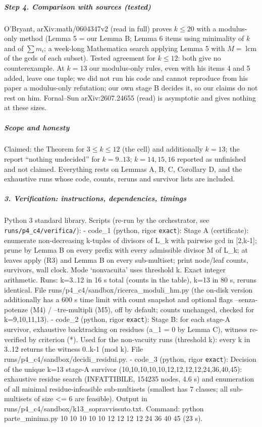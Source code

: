 \documentclass[11pt,a4paper]{article}
\begin{document}
\subparagraph{Step 4. Comparison with sources
(tested)}\label{step-4.-comparison-with-sources-tested}

O'Bryant, arXiv:math/0604347v2 (read in full) proves \(k\le20\) with a
modulus-only method (Lemma 5 = our Lemma B; Lemma 6 items using
minimality of \(k\) and of \(\sum m_i\); a week-long Mathematica search
applying Lemma 5 with \(M=\operatorname{lcm}\) of the gcds of each
subset). Tested agreement for \(k\le12\): both give no counterexample.
At \(k=13\) our modulus-only rules, even with his items 4 and 5 added,
leave one tuple; we did not run his code and cannot reproduce from his
paper a modulus-only refutation; our own stage B decides it, so our
claims do not rest on him. Fornal--Sun arXiv:2607.24655 (read) is
asymptotic and gives nothing at these sizes.

\subparagraph{Scope and honesty}\label{scope-and-honesty}

Claimed: the Theorem for \(3\le k\le12\) (the cell) and additionally
\(k=13\); the report ``nothing undecided'' for \(k=9..13\);
\(k=14,15,16\) reported as unfinished and not claimed. Everything rests
on Lemmas A, B, C, Corollary D, and the exhaustive runs whose code,
counts, reruns and survivor lists are included.

\subparagraph{3. Verification: instructions, dependencies,
timings}\label{verification-instructions-dependencies-timings}

Python 3 standard library. Scripts (re-run by the orchestrator, see
\texttt{runs/p4\_c4/verifica/}): - code\_1 (python, rigor
\texttt{exact}): Stage A (certificate): enumerate non-decreasing
k-tuples of divisors of L\_k with pairwise gcd in {[}2,k-1{]}; prune by
Lemma B on every prefix with every admissible divisor M of L\_k; at
leaves apply (R3) and Lemma B on every sub-multiset; print node/leaf
counts, survivors, wall clock. Mode `nonvacuita' uses threshold k. Exact
integer arithmetic. Runs: k=3..12 in 16 s total (counts in the table),
k=13 in 80 s, reruns identical. File
runs/p4\_c4/sandbox/ricerca\_moduli\_hm.py (the on-disk version
additionally has a 600 s time limit with count snapshot and optional
flags --senza-potenze (M4) / --tre-multipli (M5), off by default; counts
unchanged, checked for k=9,10,11,13). - code\_2 (python, rigor
\texttt{exact}): Stage B: for each stage-A survivor, exhaustive
backtracking on residues (a\_1 = 0 by Lemma C), witness re-verified by
criterion (*). Used for the non-vacuity runs (threshold k): every k in
3..12 returns the witness 0..k-1 (mod k). File
runs/p4\_c4/sandbox/decidi\_residui.py. - code\_3 (python, rigor
\texttt{exact}): Decision of the unique k=13 stage-A survivor
(10,10,10,10,10,12,12,12,12,24,36,40,45): exhaustive residue search
(INFATTIBILE, 154235 nodes, 4.6 s) and enumeration of all minimal
residue-infeasible sub-multisets (smallest has 7 classes; all
sub-multisets of size \textless= 6 are feasible). Output in
runs/p4\_c4/sandbox/k13\_sopravvissuto.txt. Command: python
parte\_minima.py 10 10 10 10 10 12 12 12 12 24 36 40 45 (23 s).
\end{document}
